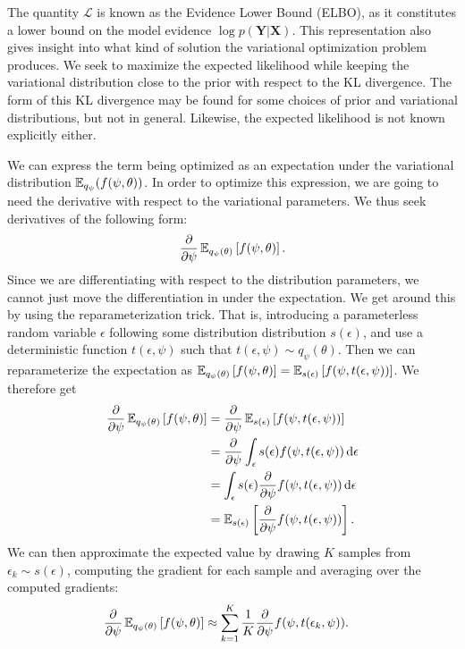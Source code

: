 The quantity $\mathcal{L}$ is known as the Evidence Lower Bound (ELBO), as it constitutes a lower bound on the model evidence $\log{p(\bm{Y}|\bm{X})}$. 
This representation also gives insight into what kind of solution the variational optimization problem produces. 
We seek to maximize the expected likelihood while keeping the variational distribution close to the prior with respect to the KL divergence.
The form of this KL divergence may be found for some choices of prior and variational distributions, but not in general.
Likewise, the expected likelihood is not known explicitly either.

We can express the term being optimized as an expectation under the variational distribution $\operatorname{\mathbb{E}}_{q_{\psi}}(f(\psi, \theta))$.
In order to optimize this expression, we are going to need the derivative with respect to the variational parameters.
We thus seek derivatives of the following form:
\begin{align}
    \pdv{\psi} \operatorname{\mathbb{E}}_{q_\psi(\theta)}\left[ f(\psi, \theta) \right].
\end{align}
Since we are differentiating with respect to the distribution parameters, we cannot just move the differentiation in under the expectation.
We get around this by using the reparameterization trick.
That is, introducing a parameterless random variable $\epsilon$ following some distribution distribution $s(\epsilon)$, and use a deterministic function $t(\epsilon, \psi)$ such that $t(\epsilon, \psi) \sim q_\psi(\theta)$.
Then we can reparameterize the expectation as
$ \operatorname{\mathbb{E}}_{q_\psi(\theta)}\left[ f(\psi, \theta) \right] = \operatorname{\mathbb{E}}_{s(\epsilon)}\left[ f(\psi, t(\epsilon, \psi)) \right]$.
We therefore get
\begin{align}
        \pdv{\psi} \operatorname{\mathbb{E}}_{q_\psi(\theta)}\left[ f(\psi, \theta) \right] &= \pdv{\psi}\operatorname{\mathbb{E}}_{s(\epsilon)}\left[ f(\psi, t(\epsilon, \psi)) \right] \\
        &= \pdv{\psi} \int_\epsilon s(\epsilon) f(\psi, t(\epsilon, \psi))\dd{\epsilon}\\
        &= \int_\epsilon s(\epsilon) \pdv{\psi} f(\psi, t(\epsilon, \psi)) \dd{\epsilon}\\
        &= \operatorname{\mathbb{E}}_{s(\epsilon)} \left[ \pdv{\psi} f(\psi, t(\epsilon, \psi)) \right].
\end{align}
We can then approximate the expected value by drawing $K$ samples from  $\epsilon_k\sim s(\epsilon)$, computing the gradient for each sample and averaging over the computed gradients:
\begin{equation} 
    \begin{aligned}
        \pdv{\psi} \operatorname{\mathbb{E}}_{q_\psi(\theta)}\left[ f(\psi, \theta) \right] &\approx \sum_{k=1}^{K} \frac{1}{K} \pdv{\psi} f(\psi, t(\epsilon_k, \psi)).  
    \end{aligned}
\end{equation}

